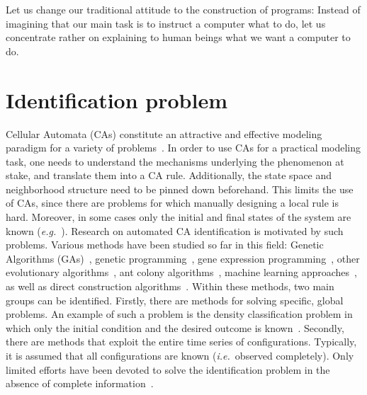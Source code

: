 
\begin{savequote}[99mm]
Let us change our traditional attitude to the construction of programs: Instead of imagining that our main task is to instruct a computer what to do, let us concentrate rather on explaining to human beings what we want a computer to do.
\end{savequote}

\chapter{Identification problem}\label{chap:id-problem}

Cellular Automata (CAs) constitute an attractive and effective modeling paradigm for a variety of problems~\cite{das2012}. In order to use CAs for a practical modeling task, one needs to understand the mechanisms underlying the phenomenon at stake, and translate them into a CA rule. Additionally, the state space and neighborhood structure need to be pinned down beforehand. This limits the use of CAs, since there are problems for which manually designing a local rule is hard. Moreover, in some cases only the initial and final states of the system are known (\emph{e.g.}~\cite{urban-ga,pattern-ga,image-proc}). Research on automated CA identification is motivated by such problems. Various methods have been studied so far in this field: Genetic Algorithms (GAs)~\cite{richards1990extracting,mitchell1996evolving,foo01,Sapin:2003:RCA:1762668.1762709}, genetic programming~\cite{conf/automata/BandiniMV08,DBLP:journals/jca/MaedaS07,andre1996discovery}, gene expression programming~\cite{DBLP:journals/corr/cs-AI-0102027}, other evolutionary algorithms~\cite{lukas2018}, ant colony algorithms~\cite{Liu:2008:BAD:1459980.1459984},  machine learning approaches~\cite{DBLP:journals/jca/BullA07}, as well as direct construction algorithms~\cite{adamatzky1994identification,journals/tsmc/YangB00,Yang:2000:NDR:2229236.2229683,Sun11}. Within these methods, two main groups can be identified. Firstly, there are methods for solving specific, global problems. An example of such a problem is the density classification problem in which only the initial condition and the desired outcome is known~\cite{gacs1978one,packard1988adaptation,1751-8121-50-34-345103,Dembowski2017}. Secondly, there are methods that exploit the entire time series of configurations. Typically, it is assumed that all configurations are known (\emph{i.e.}\ observed completely). Only limited  efforts have been devoted to solve the identification problem in the absence of complete information~\cite{richards1990extracting}.

